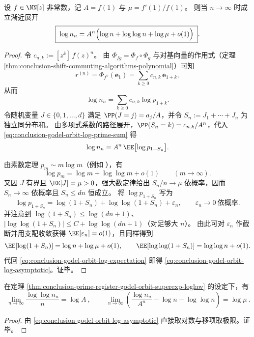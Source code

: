 \begin{theorem}\label{thm:conclusion-prime-register-godel-orbit-superexp-loglaw}
设 \(f\in\NN[z]\) 非常数，记 \(A=f(1)\) 与 \(\mu=f'(1)/f(1)\)。
则当 \(n\to\infty\) 时成立渐近展开
\begin{equation}\label{eq:conclusion-godel-orbit-log-asymptotic}
\boxed{\;
\log n_n
=A^{n}\Bigl(\log n+\log\log n+\log \mu+o(1)\Bigr)\; }.
\end{equation}
\end{theorem}
\begin{proof}
令 \(c_{n,k}:=[z^k]\,f(z)^n\)。
由 \(\Phi_{fg}=\Phi_f\circ\Phi_g\) 与对基向量的作用式（定理 \ref{thm:conclusion-shift-commuting-algorithms-polynomial}）可知
\[
r^{(n)}=\Phi_{f^n}(\mathbf e_1)=\sum_{k\ge 0}c_{n,k}\,\mathbf e_{1+k},
\]
从而
\begin{equation}\label{eq:conclusion-godel-orbit-log-prime-sum}
\log n_n=\sum_{k\ge 0}c_{n,k}\log p_{1+k}.
\end{equation}
令随机变量 \(J\in\{0,1,\dots,d\}\) 满足 \(\PP(J=j)=a_j/A\)，并令 \(S_n:=J_1+\cdots+J_n\) 为独立同分布和。
由多项式系数的路径展开，\(\PP(S_n=k)=c_{n,k}/A^n\)，代入 \eqref{eq:conclusion-godel-orbit-log-prime-sum} 得
\begin{equation}\label{eq:conclusion-godel-orbit-log-expectation}
\log n_n=A^n\,\EE\bigl[\log p_{1+S_n}\bigr].
\end{equation}

由素数定理 \(p_m\sim m\log m\)（例如 \cite{Apostol1976}），有
\[
\log p_m=\log m+\log\log m+o(1)\qquad(m\to\infty).
\]
又因 \(J\) 有界且 \(\EE[J]=\mu>0\)，强大数定律给出 \(S_n/n\to\mu\) 依概率，因而 \(S_n\to\infty\) 依概率且 \(S_n\le dn\) 恒成立。
将 \(\log p_{1+S_n}\) 写为
\[
\log p_{1+S_n}=\log(1+S_n)+\log\log(1+S_n)+\varepsilon_n,
\qquad
\varepsilon_n\to 0\ \text{依概率}.
\]
并注意到 \(\log(1+S_n)\le \log(dn+1)\)、\(|\log\log(1+S_n)|\le C+\log\log(dn+1)\)（对足够大 \(n\)）。
由此可对 \(\varepsilon_n\) 作截断并用支配收敛获得 \(\EE[\varepsilon_n]=o(1)\)，且同样得到
\[
\EE[\log(1+S_n)]=\log n+\log\mu+o(1),
\qquad
\EE[\log\log(1+S_n)]=\log\log n+o(1).
\]
代回 \eqref{eq:conclusion-godel-orbit-log-expectation} 即得 \eqref{eq:conclusion-godel-orbit-log-asymptotic}。证毕。
\end{proof}



\begin{corollary}[双对数线性化与参数可识别性]\label{cor:conclusion-godel-orbit-identifiability}
在定理 \ref{thm:conclusion-prime-register-godel-orbit-superexp-loglaw} 的设定下，有
\[
\boxed{\ \lim_{n\to\infty}\frac{\log\log n_n}{n}=\log A\ },
\qquad
\boxed{\ \lim_{n\to\infty}\left(\frac{\log n_n}{A^n}-\log n-\log\log n\right)=\log\mu\ }.
\]
\end{corollary}
\begin{proof}
由 \eqref{eq:conclusion-godel-orbit-log-asymptotic} 直接取对数与移项取极限。证毕。
\end{proof}

